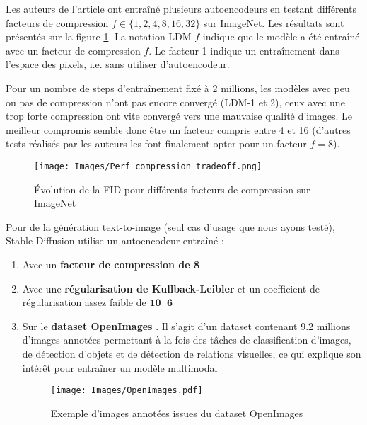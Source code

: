 \documentclass{article}
\begin{document}
\begin{minipage}{.55\textwidth}
\setlength{\parindent}{1.5em}
Les auteurs de l'article ont entraîné plusieurs autoencodeurs en testant différents facteurs de compression $f \in \{1, 2, 4, 8, 16, 32\}$ sur ImageNet. Les résultats sont présentés sur la figure \ref{fid_compression}. La notation LDM-$f$ indique que le modèle a été entraîné avec un facteur de compression $f$. Le facteur 1 indique un entraînement dans l'espace des pixels, i.e. sans utiliser d'autoencodeur. \par
Pour un nombre de steps d'entraînement fixé à 2 millions, les modèles avec peu ou pas de compression n'ont pas encore convergé (LDM-1 et 2), ceux avec une trop forte compression ont vite convergé vers une mauvaise qualité d'images. Le meilleur compromis semble donc être un facteur compris entre 4 et 16 (d'autres tests réalisés par les auteurs les font finalement opter pour un facteur $f=8$).
\vspace{0.5cm}
\end{minipage}
\begin{minipage}{.01\textwidth}
    \text{\hfill}
\end{minipage}
\begin{minipage}{.45\textwidth}
    \vspace{-1cm}
    \begin{figure}[H]
        \centering
        \texttt{[image: Images/Perf\_compression\_tradeoff.png]}
        \caption{Évolution de la FID pour différents facteurs de compression sur ImageNet}
        \label{fid_compression}
    \end{figure}
\end{minipage}
\noindent Pour de la génération text-to-image (seul cas d'usage que nous ayons testé), Stable Diffusion utilise un autoencodeur entraîné :
\begin{enumerate}
    \item Avec un \textbf{facteur de compression de 8}
    \item Avec une \textbf{régularisation de Kullback-Leibler} et un coefficient de régularisation assez faible de $\boldsymbol{10^-6}$
    \item Sur le \textbf{dataset OpenImages} \cite{OpenImages}. Il s'agit d'un dataset contenant 9.2 millions d'images annotées permettant à la fois des tâches de classification d'images, de détection d'objets et de détection de relations visuelles, ce qui explique son intérêt pour entraîner un modèle multimodal
    \begin{figure}[H]
        \centering
        \texttt{[image: Images/OpenImages.pdf]}
        \caption{Exemple d'images annotées issues du dataset OpenImages}
    \end{figure}
\end{enumerate}
\end{document}
